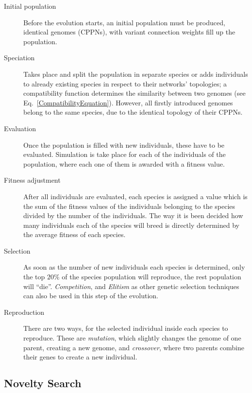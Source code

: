 \begin{description}
\item[Initial population]{Before the evolution starts, an initial population must be produced, identical genomes (CPPNs), with variant connection weights fill up the population.}

\item[Speciation]{Takes place and split the population in separate species or adds individuals to already existing species in respect to their networks' topologies; a compatibility function determines the similarity between two genomes (see Eq.~\ref{CompatibilityEquation}). However, all firstly introduced genomes belong to the same species, due to the identical topology of their CPPNs.}

\item[Evaluation] Once the population is filled with new individuals, these have to be evaluated. Simulation is take place for each of the individuals of the population, where each one of them is awarded with a fitness value.

\item[Fitness adjustment]{After all individuals are evaluated, each species is assigned a value which is the sum of the fitness values of the individuals belonging to the species divided by the number of the individuals. The way it is been decided how many individuals each of the species will breed is directly determined by the average fitness of each species.}

\item[Selection]{As soon as the number of new individuals each species is determined, only the top $20\%$ of the species population will reproduce, the rest population will ``die''. \emph{Competition}, and \emph{Elitism} as other genetic selection techniques can also be used in this step of the evolution.}

\item[Reproduction]{There are two ways, for the selected individual inside each species to reproduce. These are \emph{mutation}, which slightly changes the genome of one parent,  creating a new genome, and \emph{crossover}, where two parents combine their genes to create a new individual.}
\end{description}






\subsection{Novelty Search}

